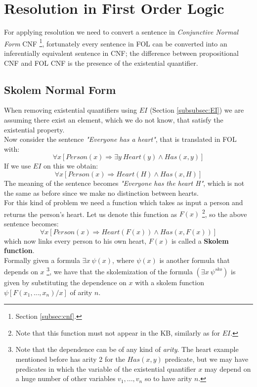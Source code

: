 \documentclass[10pt,a4paper]{article}
\begin{document}
\newpage
\section{Resolution in First Order Logic}
For applying resolution we need to convert a sentence in \textit{Conjunctive Normal Form} CNF \footnote{Section \ref{subsec:cnf}.}, fortunately every sentence in FOL can be converted into an inferentially equivalent sentence in CNF; the difference between propositional CNF and FOL CNF is the presence of the existential quantifier.


\subsection{Skolem Normal Form}
\label{sec:skolemNF}
When removing existential quantifiers using $EI$ (Section \ref{subsubsec:EI}) we are assuming there exist an element, which we do not know, that satisfy the existential property.\\
Now consider the sentence \textit{"Everyone has a heart"}, that is translated in FOL with:
\[\forall x [Person(x)\Rightarrow \exists y\ Heart(y)\wedge Has(x,y)]\]
If we use $EI$ on this we obtain:
\[\forall x [Person(x)\Rightarrow  Heart(H)\wedge Has(x,H)]\]
The meaning of the sentence becomes \textit{"Everyone has the heart H"}, which is not the same as before since we make no distinction between hearts.\\
For this kind of problem we need a function which takes as input a person and returns the person's heart. Let us denote this function as $F(x)$ \footnote{Note that this function must not appear in the KB, similarly as for $EI$.}, so the above sentence becomes:
\[\forall x [Person(x)\Rightarrow  Heart(F(x))\wedge Has(x,F(x))]\]
which now links every person to his own heart, $F(x)$ is called a \textbf{Skolem function}.\\
Formally given a formula $\exists x\ \psi(x)$, where $\psi(x)$ is another formula that depends on $x$ \footnote{Note that the dependence can be of any kind of \textit{arity}. The heart example mentioned before has arity 2 for the $Has(x,y)$ predicate, but we may have predicates in which the variable of the existential quantifier $x$ may depend on a huge number of other variables $v_1,...,v_n$ so to have arity $n$.}, we have that the skolemization of the formula $(\exists x	\ \psi^{sko})$ is given by substituting the dependence on $x$ with a skolem function $\psi[F(x_1,...,x_n)/x]$ of arity $n$.
\end{document}
